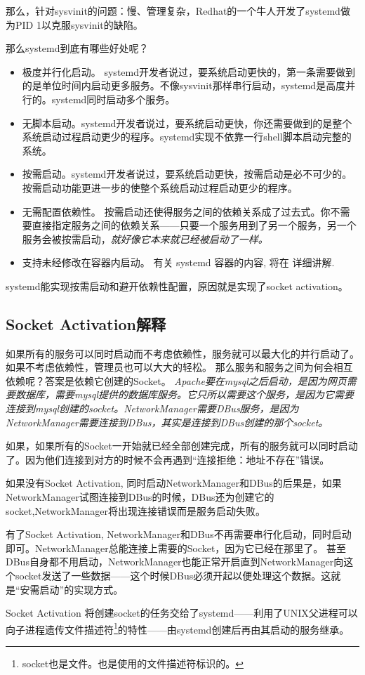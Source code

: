 那么，针对sysvinit的问题：慢、管理复杂，Redhat的一个牛人开发了systemd做为PID 1以克服sysvinit的缺陷。

那么systemd到底有哪些好处呢？



\begin{itemize}
\item 极度并行化启动。
		systemd开发者说过，要系统启动更快的，第一条需要做到的是单位时间内启动更多服务。不像sysvinit那样串行启动，systemd是高度并行的。systemd同时启动多个服务。

\item 无脚本启动。systemd开发者说过，要系统启动更快，你还需要做到的是整个系统启动过程启动更少的程序。systemd实现不依靠一行shell脚本启动完整的系统。

\item	按需启动。systemd开发者说过，要系统启动更快，按需启动是必不可少的。按需启动功能更进一步的使整个系统启动过程启动更少的程序。

\item	无需配置依赖性。
		按需启动还使得服务之间的依赖关系成了过去式。你不需要直接指定服务之间的依赖关系——只要一个服务用到了另一个服务，另一个服务会被按需启动，\em 就好像它本来就已经被启动了一样。

\item	支持未经修改在容器内启动。
		有关 systemd 容器的内容, 将在 \protect{} 详细讲解. 
\end{itemize}

systemd能实现按需启动和避开依赖性配置，原因就是实现了socket activation。

\begin{insertnote}
\subsection*{Socket Activation解释}
如果所有的服务可以同时启动而不考虑依赖性，服务就可以最大化的并行启动了。如果不考虑依赖性，管理员也可以大大的轻松。
那么服务和服务之间为何会相互依赖呢？答案是依赖它创建的Socket。{ \it Apache要在mysql之后启动，是因为网页需要数据库，需要mysql提供的数据库服务。它只所以需要这个服务，是因为它需要连接到mysql创建的socket。NetworkManager需要DBus服务，是因为NetworkManager需要连接到DBus，其实是连接到DBus创建的那个socket。}

如果，如果所有的Socket一开始就已经全部创建完成，所有的服务就可以同时启动了。因为他们连接到对方的时候不会再遇到“连接拒绝：地址不存在”错误。

如果没有Socket Activation, 同时启动NetworkManager和DBus的后果是，如果NetworkManager试图连接到DBus的时候，DBus还为创建它的socket,NetworkManager将出现连接错误而是服务启动失败。

有了Socket Activation, NetworkManager和DBus不再需要串行化启动，同时启动即可。NetworkManager总能连接上需要的Socket，因为它已经在那里了。
甚至DBus自身都不用启动，NetworkManager也能正常开启直到NetworkManager向这个socket发送了一些数据——这个时候DBus必须开起以便处理这个数据。这就是“安需启动”的实现方式。

Socket Activation 将创建socket的任务交给了systemd——利用了UNIX父进程可以向子进程遗传文件描述符\footnote{socket也是文件。也是使用的文件描述符标识的。}的特性——由systemd创建后再由其启动的服务继承。
\end{insertnote}

